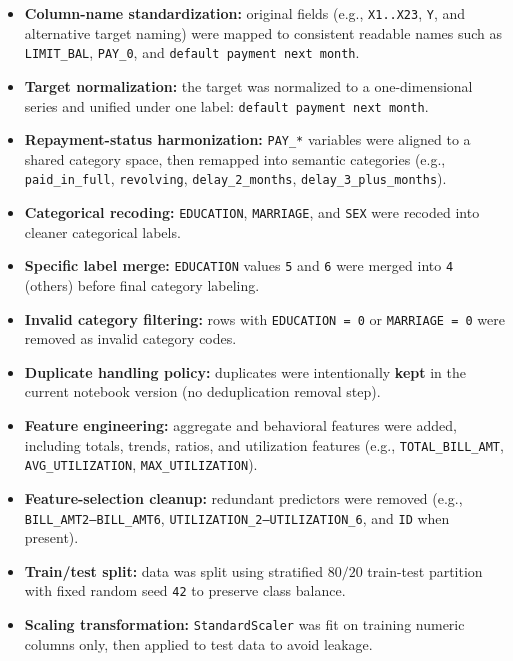 \begin{itemize}
	\item \textbf{Column-name standardization:} original fields (e.g., \texttt{X1..X23}, \texttt{Y}, and alternative target naming) were mapped to consistent readable names such as \texttt{LIMIT\_BAL}, \texttt{PAY\_0}, and \texttt{default payment next month}.
	\item \textbf{Target normalization:} the target was normalized to a one-dimensional series and unified under one label: \texttt{default payment next month}.
	\item \textbf{Repayment-status harmonization:} \texttt{PAY\_*} variables were aligned to a shared category space, then remapped into semantic categories (e.g., \texttt{paid\_in\_full}, \texttt{revolving}, \texttt{delay\_2\_months}, \texttt{delay\_3\_plus\_months}).
	\item \textbf{Categorical recoding:} \texttt{EDUCATION}, \texttt{MARRIAGE}, and \texttt{SEX} were recoded into cleaner categorical labels.
	\item \textbf{Specific label merge:} \texttt{EDUCATION} values \texttt{5} and \texttt{6} were merged into \texttt{4} (others) before final category labeling.
	\item \textbf{Invalid category filtering:} rows with \texttt{EDUCATION = 0} or \texttt{MARRIAGE = 0} were removed as invalid category codes.
	\item \textbf{Duplicate handling policy:} duplicates were intentionally \textbf{kept} in the current notebook version (no deduplication removal step).
	\item \textbf{Feature engineering:} aggregate and behavioral features were added, including totals, trends, ratios, and utilization features (e.g., \texttt{TOTAL\_BILL\_AMT}, \texttt{AVG\_UTILIZATION}, \texttt{MAX\_UTILIZATION}).
	\item \textbf{Feature-selection cleanup:} redundant predictors were removed (e.g., \texttt{BILL\_AMT2--BILL\_AMT6}, \texttt{UTILIZATION\_2--UTILIZATION\_6}, and \texttt{ID} when present).
	\item \textbf{Train/test split:} data was split using stratified \(80/20\) train-test partition with fixed random seed \texttt{42} to preserve class balance.
	\item \textbf{Scaling transformation:} \texttt{StandardScaler} was fit on training numeric columns only, then applied to test data to avoid leakage.
\end{itemize}
